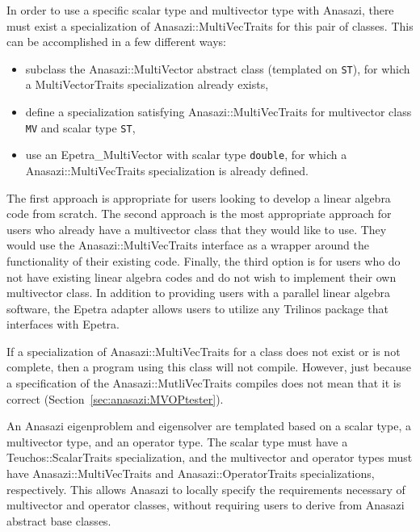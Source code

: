 In order to use a specific scalar type and multivector type with Anasazi, there
must exist a specialization of Anasazi::MultiVecTraits for this pair of
classes. This can be accomplished in a few different ways:
\begin{itemize}
\item subclass the Anasazi::MultiVector abstract class (templated on
\verb!ST!), for which a MultiVectorTraits specialization already exists,
\item define a specialization satisfying Anasazi::MultiVecTraits for multivector
class \verb!MV! and scalar type \verb!ST!,
\item use an Epetra\_MultiVector with scalar type \verb!double!, 
for which a Anasazi::MultiVecTraits specialization is already defined.
\end{itemize}

The first approach is appropriate for users looking to develop a linear algebra
code from scratch.  The second approach is the most appropriate approach for
users who already have a multivector class that they would like to use. They
would use the Anasazi::MultiVecTraits  interface as a wrapper around the
functionality of their existing code.  Finally, the third option is for users
who do not have existing linear algebra codes and do not wish to implement
their own multivector class. In addition to providing users with a parallel
linear algebra software, the Epetra adapter allows users to utilize any
Trilinos package that interfaces with Epetra.

If a specialization of Anasazi::MultiVecTraits for a class does not
exist or is not complete, then a program using this class will not compile.
However, just because a specification of the Anasazi::MutliVecTraits
compiles does not mean that it is correct
(Section~\ref{sec:anasazi:MVOPtester}).

\begin{remark} 
An Anasazi eigenproblem and eigensolver are templated based on a scalar type, a
multivector type, and an operator type. The scalar type must have a
Teuchos::ScalarTraits specialization, and the multivector and operator types
must have Anasazi::MultiVecTraits and Anasazi::OperatorTraits specializations,
respectively. This allows Anasazi to locally specify the requirements necessary
of multivector and operator classes, without requiring users to derive from
Anasazi abstract base classes.
\end{remark}



